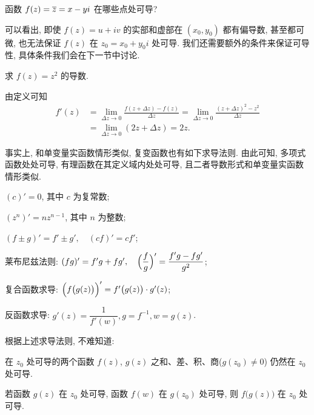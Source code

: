 \begin{exercise}
  函数 $f(z)=\overline z=x-yi$ 在哪些点处可导? 
\end{exercise}

可以看出, 即使 $f(z)=u+iv$ 的实部和虚部在 $(x_0,y_0)$ 都有偏导数, 甚至都可微, 也无法保证 $f(z)$ 在 $z_0=x_0+y_0i$ 处可导.
我们还需要额外的条件来保证可导性, 具体条件我们会在下一节中讨论.

\begin{example}
  求 $f(z)=z^2$ 的导数.
\end{example}

\begin{solution}
  由定义可知
  \begin{align*}
  f'(z)&=\lim_{\Delta z\to 0}\frac{f(z+\Delta z)-f(z)}{\Delta z}
   =\lim_{\Delta z\to 0}\frac{(z+\Delta z)^2-z^2}{\Delta z}\\
  &=\lim_{\Delta z\to 0}(2z+\Delta z)=2z.
  \end{align*}
\end{solution}

事实上, 和单变量实函数情形类似, 复变函数也有如下求导法则.
由此可知, 多项式函数处处可导, 有理函数在其定义域内处处可导, 且二者导数形式和单变量实函数情形类似.
\begin{theorem}
  \begin{enumpar}
    \item $(c)'=0$, 其中 $c$ 为复常数;
    \item $(z^n)'=nz^{n-1}$, 其中 $n$ 为整数;
    \item $(f\pm g)'=f'\pm g',\quad (cf)'=cf'$;
    \item 莱布尼兹法则: $(fg)'=f'g+fg',\quad \Bigl(\dfrac fg\Bigr)'=\dfrac{f'g-fg'}{g^2}$;
    \item 复合函数求导: $\Bigl(f\bigl(g(z)\bigr)\Bigr)'=f'\bigl(g(z)\bigr)\cdot g'(z)$;
    \item 反函数求导: $g'(z)=\dfrac1{f'(w)}, g=f^{-1}, w=g(z)$.
  \end{enumpar}
\end{theorem}

根据上述求导法则, 不难知道:
\begin{theorem}\label{thm:four-derivable}
  \begin{enumpar}
    \item 在 $z_0$ 处可导的两个函数 $f(z)$, $g(z)$ 之和、差、积、商($g(z_0)\neq 0$) 仍然在 $z_0$ 处可导.
    \item 若函数 $g(z)$ 在 $z_0$ 处可导, 函数 $f(w)$ 在 $g(z_0)$ 处可导, 则 $f\bigl(g(z)\bigr)$ 在 $z_0$ 处可导.
  \end{enumpar}
\end{theorem}


